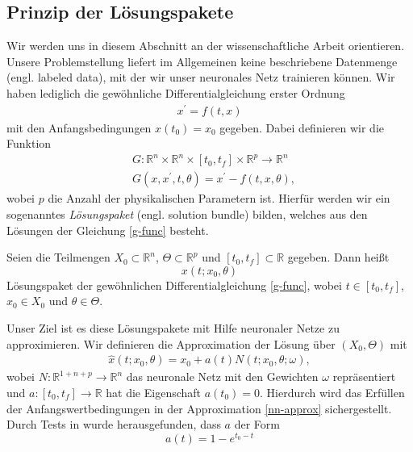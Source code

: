 \subsection{Prinzip der Lösungspakete}
\label{subsec:lsgpakete}
Wir werden uns in diesem Abschnitt an der wissenschaftliche Arbeit \cite{flamantSolvingDifferentialEquations2020}
orientieren. Unsere Problemstellung liefert im Allgemeinen keine beschriebene Datenmenge (engl. labeled data), mit der
wir unser neuronales Netz trainieren können. Wir haben lediglich die gewöhnliche Differentialgleichung erster Ordnung
\begin{align}
    \label{dgl-machinelearnung}
    x^{\prime} = f(t,x)
\end{align}
mit den Anfangsbedingungen $x(t_0)=x_0$ gegeben. Dabei definieren wir die Funktion
\begin{align}
    \label{g-func}
    &G:\mathbb{R}^n \times \mathbb{R}^n \times [t_0, t_f] \times \mathbb{R}^p \rightarrow \mathbb{R}^n \nonumber\\
    &G \left( x, x^{\prime}, t, \theta \right) = x^{\prime} - f(t, x, \theta),
\end{align}
wobei $p$ die Anzahl der physikalischen Parametern ist. Hierfür werden wir ein sogenanntes \textit{Lösungspaket}
(engl. solution bundle) bilden, welches aus den Lösungen der Gleichung \eqref{g-func} besteht.
\begin{definition}
    \label{sol-bundle}
    Seien die Teilmengen $X_0 \subset \mathbb{R}^n$, $\Theta \subset \mathbb{R}^p$ und $[t_0,t_f] \subset \mathbb{R}$
    gegeben. Dann heißt
    \[
        x(t;x_0, \theta)
    \]
    Lösungspaket der gewöhnlichen Differentialgleichung \eqref{g-func}, wobei $t \in [t_0,t_f]$, $x_0 \in X_0$ und
    $\theta \in \Theta$.
\end{definition}
Unser Ziel ist es diese Lösungspakete mit Hilfe neuronaler Netze zu approximieren. Wir definieren die Approximation der
Lösung über $(X_0,\Theta)$ mit
\begin{align}
    \label{nn-approx}
    \hat{x}(t;x_0, \theta) = x_0 + a(t) N(t; x_0, \theta; \omega),
\end{align}
wobei $N:\mathbb{R}^{1+n+p} \rightarrow \mathbb{R}^n$ das neuronale Netz mit den Gewichten $\omega$ repräsentiert und
$a:[t_0,t_f] \rightarrow \mathbb{R}$ hat die Eigenschaft $a(t_0)=0$. Hierdurch wird das Erfüllen der
Anfangswertbedingungen in der Approximation \eqref{nn-approx} sichergestellt. Durch Tests in
\cite{flamantSolvingDifferentialEquations2020} wurde herausgefunden, dass $a$ der Form
\[
    a(t) = 1 - e^{t_0-t}
\]
